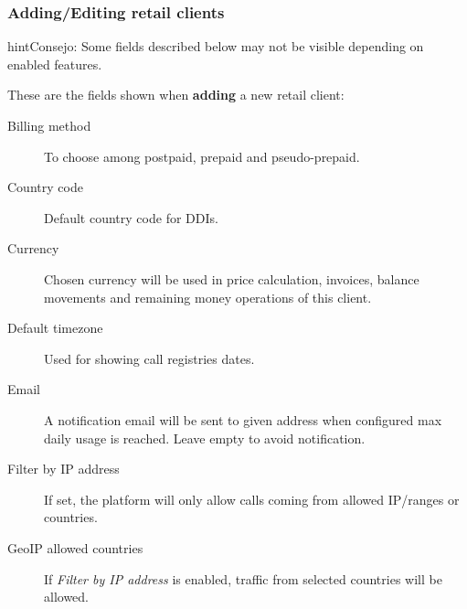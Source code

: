 \documentclass[letterpaper,10pt,spanish]{sphinxmanual}
\begin{document}
\subsubsection{Adding/Editing retail clients}
\label{administration_portal/brand/clients/retail:adding-editing-retail-clients}
\begin{notice}{hint}{Consejo:}
Some fields described below may not be visible depending on enabled features.
\end{notice}

These are the fields shown when \textbf{adding} a new retail client:
\begin{description}
\item[{Billing method}] \leavevmode{}\label{administration_portal/brand/clients/retail:term-billing-method}
To choose among postpaid, prepaid and pseudo-prepaid.

\item[{Country code}] \leavevmode{}\label{administration_portal/brand/clients/retail:term-country-code}
Default country code for DDIs.

\item[{Currency}] \leavevmode{}\label{administration_portal/brand/clients/retail:term-currency}
Chosen currency will be used in price calculation, invoices, balance movements and
remaining money operations of this client.

\item[{Default timezone}] \leavevmode{}\label{administration_portal/brand/clients/retail:term-default-timezone}
Used for showing call registries dates.

\item[{Email}] \leavevmode{}\label{administration_portal/brand/clients/retail:term-email}
A notification email will be sent to given address when configured max daily usage is reached. Leave empty to
avoid notification.

\item[{Filter by IP address}] \leavevmode{}\label{administration_portal/brand/clients/retail:term-filter-by-ip-address}
If set, the platform will only allow calls coming from allowed IP/ranges or countries.

\item[{GeoIP allowed countries}] \leavevmode{}\label{administration_portal/brand/clients/retail:term-geoip-allowed-countries}
If \emph{Filter by IP address} is enabled, traffic from selected countries will be allowed.


\end{description}
\end{document}
